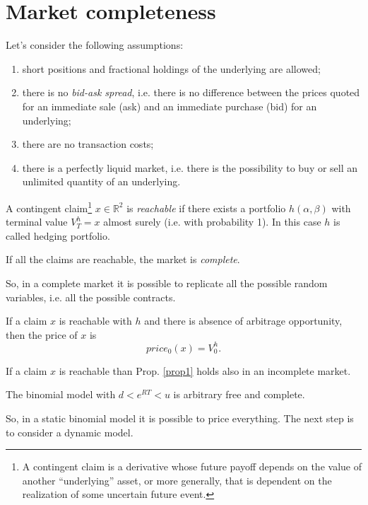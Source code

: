 \section{Market completeness}
Let's consider the following assumptions:
\begin{enumerate}
    \item short positions and fractional holdings of the underlying are allowed;
    \item there is no \emph{bid-ask spread}, i.e. there is no difference between the prices quoted for an immediate sale (ask) and an immediate purchase (bid) for an underlying;
    \item there are no transaction costs;
    \item there is a perfectly liquid market, i.e. there is the possibility to buy or sell an unlimited quantity of an underlying.
\end{enumerate}
\begin{definition}
    A contingent claim\footnote{A contingent claim is a derivative whose future payoff depends on the value of another “underlying” asset, or more generally, that is dependent on the realization of some uncertain future event.} $x\in\mathbb{R}^2$ is \emph{reachable} if there exists a portfolio $h(\alpha,\beta)$ with terminal value $V^h_T=x$ almost surely (i.e. with probability 1). In this case $h$ is called hedging portfolio.
\end{definition}
\begin{definition}
    If all the claims are reachable, the market is \emph{complete}.
\end{definition}
So, in a complete market it is possible to replicate all the possible random variables, i.e. all the possible contracts.
\begin{proposition}\label{prop1}
    If a claim $x$ is reachable with $h$ and there is absence of arbitrage opportunity, then the price of $x$ is
    \begin{equation}
        price_0(x) = V_0^h.
    \end{equation}
\end{proposition}
\begin{remark}
    If a claim $x$ is reachable than Prop. \ref{prop1} holds also in an incomplete market.
\end{remark}
\begin{proposition}\label{prop2}
    The binomial model with $d<e^{RT}<u$ is arbitrary free and complete.
\end{proposition}
\noindent So, in a static binomial model it is possible to price everything. The next step is to consider a dynamic model.

